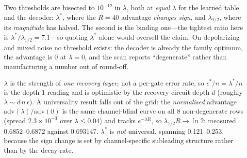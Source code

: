 \documentclass[10pt,a4paper]{article}
\begin{document}
Two thresholds are bisected to $10^{-12}$ in $\lambda$, both at \emph{equal}
$\lambda$ for the learned table and the decoder: $\lambda^*$, where the
$R=40$ advantage \emph{changes sign}, and $\lambda_{1/2}$, where its
\emph{magnitude} has halved.  The second is the binding one---the tightest ratio
here is $\lambda^*/\lambda_{1/2}=7.1$---so quoting $\lambda^*$ alone would
oversell the claim.  On depolarizing and mixed noise no threshold exists: the
decoder is already the family optimum, the advantage is $0$ at $\lambda=0$, and the
scan reports ``degenerate'' rather than manufacturing a number out of round-off.

$\lambda$ is the strength of \emph{one recovery layer}, not a per-gate error rate,
so $\epsilon^*/n=\lambda^*/n$ is the depth-$1$ reading and is optimistic by the
recovery circuit depth $d$ (roughly $\lambda\sim d\,n\,\epsilon$).  A universality
result falls out of the grid: the \emph{normalised} advantage
$\mathrm{adv}(\lambda)/\mathrm{adv}(0)$ is the same channel-blind curve on all 8
non-degenerate rows (spread $2.3\times 10^{-3}$ over $\lambda\le0.04$) and tracks
$e^{-\lambda R}$, so $\lambda_{1/2}R\to\ln2$: measured $0.6852$--$0.6872$ against $0.693147$.
$\lambda^*$ is \emph{not} universal, spanning 0.121--0.253, because the sign change
is set by channel-specific subleading structure rather than by the decay rate.
\end{document}
